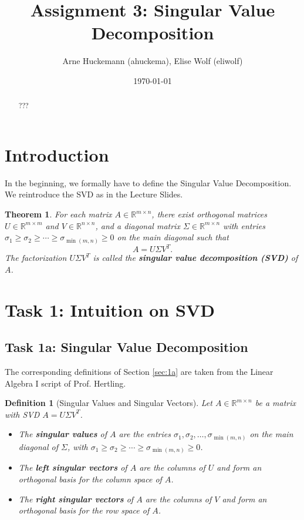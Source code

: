 \documentclass[a4paper,oneside,bibliography=totoc]{scrartcl}
\let\cite\citep
\newtheorem{defn}{Definition}[section] %
\newtheorem{Satz}{Theorem}[section]
\begin{document}
\subject{Report - Machine Learning (HWS 2024)} %
\title{Assignment 3: Singular Value Decomposition}
\author{Arne Huckemann (ahuckema), Elise Wolf (eliwolf)}
\date{\today}
\maketitle


\begin{abstract}
???
\end{abstract}


\section{Introduction}
\label{ch:intro}
In the beginning, we formally have to define the Singular Value Decomposition. We reintroduce the SVD as in the Lecture Slides. \cite{gemulla}

\begin{Satz}
For each matrix \( A \in \mathbb{R}^{m \times n} \), there exist orthogonal matrices \( U \in \mathbb{R}^{m \times m} \) and \( V \in \mathbb{R}^{n \times n} \), and a diagonal matrix \( \Sigma \in \mathbb{R}^{m \times n} \) with entries \( \sigma_1 \geq \sigma_2 \geq \cdots \geq \sigma_{\min(m,n)} \geq 0 \) on the main diagonal such that
\[
A = U \Sigma V^T.
\]
The factorization \( U \Sigma V^T \) is called the \textbf{singular value decomposition (SVD)} of \( A \).
\end{Satz}

\section{Task 1: Intuition on SVD}

\subsection{Task 1a: Singular Value Decomposition}

The corresponding definitions of Section \ref{sec:1a} are taken from the Linear Algebra I script of Prof. Hertling. \cite{hertling}

\begin{defn}[Singular Values and Singular Vectors]
Let \( A \in \mathbb{R}^{m \times n} \) be a matrix with SVD \( A = U \Sigma V^T \).
\begin{itemize}
    \item The \textbf{singular values} of \( A \) are the entries \( \sigma_1, \sigma_2, \dots, \sigma_{\min(m,n)} \) on the main diagonal of \( \Sigma \), with \( \sigma_1 \geq \sigma_2 \geq \cdots \geq \sigma_{\min(m,n)} \geq 0 \).
    \item The \textbf{left singular vectors} of \( A \) are the columns of \( U \) and form an orthogonal basis for the column space of \( A \).
    \item The \textbf{right singular vectors} of \( A \) are the columns of \( V \) and form an orthogonal basis for the row space of \( A \).
\end{itemize}
\end{defn}
\end{document}
